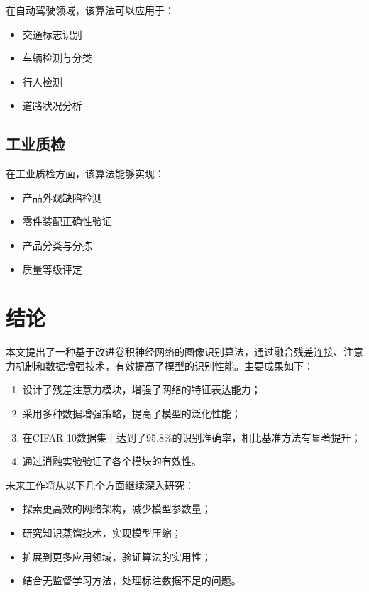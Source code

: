 \documentclass[a4paper,12pt]{article}
\begin{document}
在自动驾驶领域，该算法可以应用于：
\begin{itemize}
    \item 交通标志识别
    \item 车辆检测与分类
    \item 行人检测
    \item 道路状况分析
\end{itemize}

\subsection{工业质检}

在工业质检方面，该算法能够实现：
\begin{itemize}
    \item 产品外观缺陷检测
    \item 零件装配正确性验证
    \item 产品分类与分拣
    \item 质量等级评定
\end{itemize}

\section{结论}

本文提出了一种基于改进卷积神经网络的图像识别算法，通过融合残差连接、注意力机制和数据增强技术，有效提高了模型的识别性能。主要成果如下：

\begin{enumerate}
    \item 设计了残差注意力模块，增强了网络的特征表达能力；
    \item 采用多种数据增强策略，提高了模型的泛化性能；
    \item 在CIFAR-10数据集上达到了95.8\%的识别准确率，相比基准方法有显著提升；
    \item 通过消融实验验证了各个模块的有效性。
\end{enumerate}

未来工作将从以下几个方面继续深入研究：
\begin{itemize}
    \item 探索更高效的网络架构，减少模型参数量；
    \item 研究知识蒸馏技术，实现模型压缩；
    \item 扩展到更多应用领域，验证算法的实用性；
    \item 结合无监督学习方法，处理标注数据不足的问题。
\end{itemize}
\end{document}
